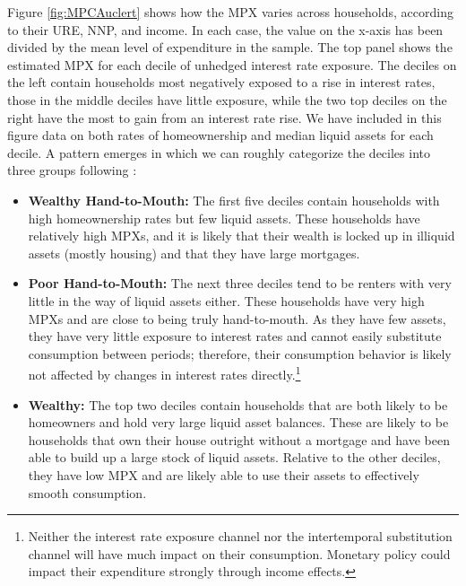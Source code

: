 \documentclass[titlepage]{\econtex}\newcommand{\texname}{ConsumptionHeterogeneity}
\begin{document}
	Figure \ref{fig:MPCAuclert} shows how the MPX varies across households, according to their URE, NNP, and income. In each case, the value on the x-axis has been divided by the mean level of expenditure in the sample. The top panel shows the estimated MPX for each decile of unhedged interest rate exposure. The deciles on the left contain households most negatively exposed to a rise in interest rates, those in the middle deciles have little exposure, while the two top deciles on the right have the most to gain from an interest rate rise. We have included in this figure data on both rates of homeownership and median liquid assets for each decile. A pattern emerges in which we can roughly categorize the deciles into three groups following \cite{violante_wealthy_2014}:
	\begin{itemize}
		\item \textbf{Wealthy Hand-to-Mouth:} The first five deciles contain households with high homeownership rates but few liquid assets. These households have relatively high MPXs, and it is likely that their wealth is locked up in illiquid assets (mostly housing) and that they have large mortgages.
		\item \textbf{Poor Hand-to-Mouth:} The next three deciles tend to be renters with very little in the way of liquid assets either. These households have very high MPXs and are close to being truly hand-to-mouth. As they have few assets, they have very little exposure to interest rates and cannot easily substitute consumption between periods; therefore, their consumption behavior is likely not affected by changes in interest rates directly.\footnote{Neither the interest rate exposure channel nor the intertemporal substitution channel will have much impact on their consumption. Monetary policy could impact their expenditure strongly through income effects.}
		\item \textbf{Wealthy:} The top two deciles contain households that are both likely to be homeowners and hold very large liquid asset balances. These are likely to be households that own their house outright without a mortgage and have been able to build up a large stock of liquid assets. Relative to the other deciles, they have low MPX and are likely able to use their assets to effectively smooth consumption.
	\end{itemize}
	
\end{document}
